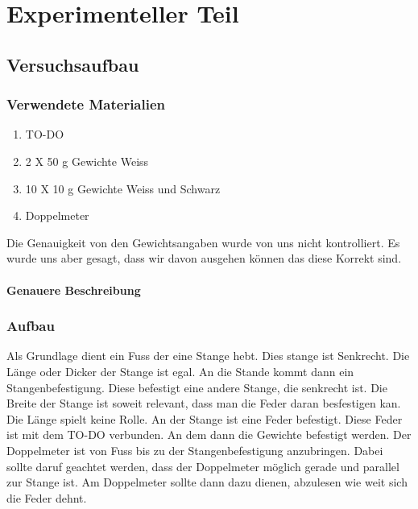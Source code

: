 \documentclass[../main.tex]{subfiles} %
\begin{document}
\chapter{Experimenteller Teil}\label{ch:experimenteller-teil}

    \section{Versuchsaufbau}\label{sec:versuchsaufbau}
    \subsection{Verwendete Materialien}\label{subsec:versuchsaufbau}
    \begin{enumerate}
        \item TO-DO
        \item 2 X 50 g Gewichte Weiss
        \item 10 X 10 g Gewichte Weiss und Schwarz
        \item Doppelmeter
    \end{enumerate}
    \begin{tcolorbox}[title=Hinweis zu den Gewichtsangeben]
        Die Genauigkeit von den Gewichtsangaben wurde von uns nicht kontrolliert. Es wurde uns aber gesagt, dass wir davon ausgehen können das diese Korrekt sind.
    \end{tcolorbox}
    \subsubsection{Genauere Beschreibung}\label{subsubsec:materialien}

    \subsection{Aufbau}\label{subsec:aufbau}
    Als Grundlage dient ein Fuss der eine Stange hebt. Dies stange ist Senkrecht. 
    Die Länge oder Dicker der Stange ist egal. An die Stande kommt dann ein Stangenbefestigung. 
    Diese befestigt eine andere Stange, die senkrecht ist. 
    Die Breite der Stange ist soweit relevant, dass man die Feder daran besfestigen kan. Die Länge spielt keine Rolle.
    An der Stange ist eine Feder befestigt. Diese Feder ist mit dem TO-DO verbunden.
    An dem dann die Gewichte befestigt werden.
    Der Doppelmeter ist von Fuss bis zu der Stangenbefestigung anzubringen. Dabei sollte daruf geachtet werden, dass der Doppelmeter möglich gerade und parallel zur Stange ist.
    Am Doppelmeter sollte dann dazu dienen, abzulesen wie weit sich die Feder dehnt.
\end{document}
